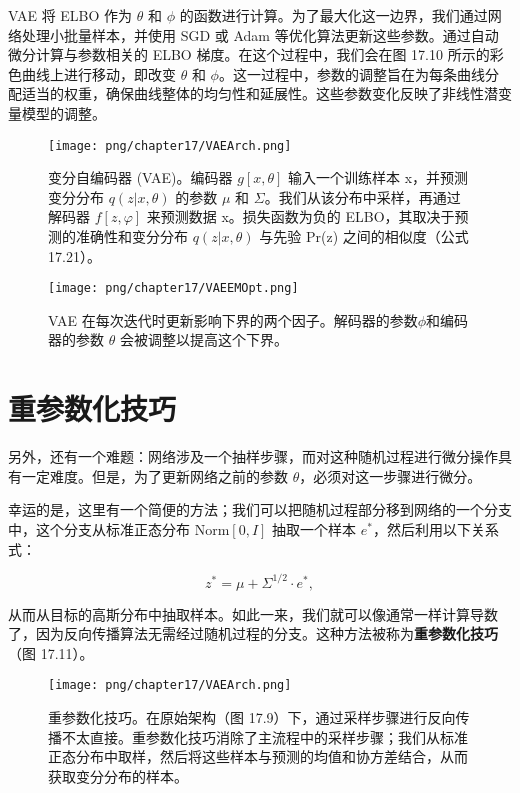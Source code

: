 VAE 将 ELBO 作为 \(\theta\) 和 \(\phi\) 的函数进行计算。为了最大化这一边界，我们通过网络处理小批量样本，并使用 SGD 或 Adam 等优化算法更新这些参数。通过自动微分计算与参数相关的 ELBO 梯度。在这个过程中，我们会在图 17.10 所示的彩色曲线上进行移动，即改变 \(\theta\) 和 \(\phi\)。这一过程中，参数的调整旨在为每条曲线分配适当的权重，确保曲线整体的均匀性和延展性。这些参数变化反映了非线性潜变量模型的调整。

\begin{figure}[ht!]
\centering
\texttt{[image: png/chapter17/VAEArch.png]}
\caption{变分自编码器 (VAE)。编码器 \(g[x, \theta]\) 输入一个训练样本 x，并预测变分分布 \(q(z|x, \theta)\) 的参数 \(\mu\) 和 \(\Sigma\)。我们从该分布中采样，再通过解码器 \(f[z, \varphi]\) 来预测数据 x。损失函数为负的 ELBO，其取决于预测的准确性和变分分布 \(q(z|x, \theta)\) 与先验 Pr(z) 之间的相似度（公式 17.21）。}
\end{figure}


\begin{figure}[ht!]
\centering
\texttt{[image: png/chapter17/VAEEMOpt.png]}
\caption{VAE 在每次迭代时更新影响下界的两个因子。解码器的参数\(\phi\)和编码器的参数 \(\theta\) 会被调整以提高这个下界。}
\end{figure}


\section{重参数化技巧}
另外，还有一个难题：网络涉及一个抽样步骤，而对这种随机过程进行微分操作具有一定难度。但是，为了更新网络之前的参数 \(\theta\)，必须对这一步骤进行微分。

幸运的是，这里有一个简便的方法；我们可以把随机过程部分移到网络的一个分支中，这个分支从标准正态分布 \(\text{Norm}[0, I]\) 抽取一个样本 \(e^*\)，然后利用以下关系式：

\begin{equation}
z^* = \mu + \Sigma^{1/2} \cdot e^*, 
\end{equation}

从而从目标的高斯分布中抽取样本。如此一来，我们就可以像通常一样计算导数了，因为反向传播算法无需经过随机过程的分支。这种方法被称为\textbf{重参数化技巧}（图 17.11）。

\begin{figure}[ht!]
\centering
\texttt{[image: png/chapter17/VAEArch.png]}
\caption{重参数化技巧。在原始架构（图 17.9）下，通过采样步骤进行反向传播不太直接。重参数化技巧消除了主流程中的采样步骤；我们从标准正态分布中取样，然后将这些样本与预测的均值和协方差结合，从而获取变分分布的样本。}
\end{figure}


